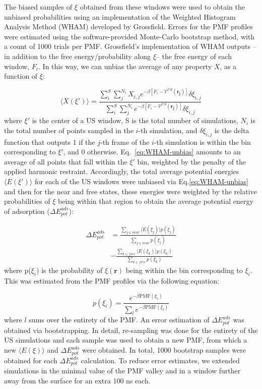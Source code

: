 \documentclass[journal=jcisd8,manuscript=article,layout=twocolumn]{achemso}
\begin{document}
The biased samples of $\xi$ obtained from these windows were used to obtain the unbiased probabilities using an implementation of the Weighted Histogram Analysis Method (WHAM) \cite{Kumar_1992, Kumar_1995} developed by Grossfield.\cite{WHAM}
Errors for the PMF profiles were estimated using the software-provided Monte-Carlo bootstrap method, with a count of 1000 trials per PMF.
Grossfield's implementation of WHAM outputs --in addition to the free energy/probability along $\xi$-- the free energy of each window, $F_i$.
In this way, we can unbias the average of any property $X$, as a function of $\xi$:

\begin{equation}
\label{eq:WHAM-unbias}
\langle X(\xi') \rangle = \frac{\sum_i^{S} \sum_j^{N_i} X_{i, j}
  e^{-\beta[F_i - \mathcal{V}^{US}(\mathbf{r_j})]}
  \delta \xi_{i, j}}{\sum_i^{S} \sum_j^{N_i}
  e^{-\beta[F_i - \mathcal{V}^{US}(\mathbf{r_j})]}
  \delta \xi_{i, j}}
\end{equation}
%
where $\xi'$ is the center of a US window, S is the total number of simulations, $N_i$ is the total number of points sampled in the $i$-th simulation, and $\delta \xi_{i, j}$ is the delta function that outputs $1$ if the $j$-th frame of the $i$-th simulation is within the bin corresponding to $\xi'$, and 0 otherwise.
Eq.~\ref{eq:WHAM-unbias} amounts to an average of all points that fall within the $\xi'$ bin, weighted by the penalty of the applied harmonic restraint. Accordingly, the total average potential energies $\langle E(\xi')\rangle$ for each of the US windows were unbiased via Eq.\ref{eq:WHAM-unbias} and then for the near and free states, these energies were weighted by the relative probabilities of $\xi$ being within  that region to obtain the average potential energy of adsorption  ($\Delta E^{ads}_{pot}$):

 \begin{align}
    \label{eq:Eads}
    \Delta E^{ads}_{pot} &= \frac{\sum_{j \in near} \langle E(\xi_j)\rangle p(\xi_j)}{\sum_{j \in near} p(\xi_j)} \nonumber \\
    &- \frac{\sum_{k \in free} \langle E(\xi_k)\rangle p(\xi_k)}{\sum_{k \in free} p(\xi_k)}
\end{align}
%
where p($\xi_i$) is the probability of $\xi(\mathbf{r})$ being within the bin corresponding to $\xi_i$.
This was estimated from the PMF profiles via the following equation:

\begin{equation}
    p(\xi_i) = \frac{e^{-\beta \mathrm{PMF}(\xi_i)}}{\sum_{l} e^{-\beta \mathrm{PMF}(\xi_l)}}
\end{equation}
%
where $l$ sums over the entirety of the PMF. An error estimation of $\Delta E^{ads}_{pot}$ was obtained via bootstrapping.
In detail, re-sampling was done for the entirety of the US simulations and each sample was used to obtain a new PMF, from which a new $\langle E(\xi)\rangle$ and $\Delta E^{ads}_{pot}$ were obtained.
In total, 1000 bootstrap samples were obtained for each $\Delta E^{ads}_{pot}$ calculation. To reduce error estimates, we extended simulations in the minimal value of the PMF valley and in a window further away from the surface for an extra 100 ns each.
\end{document}
